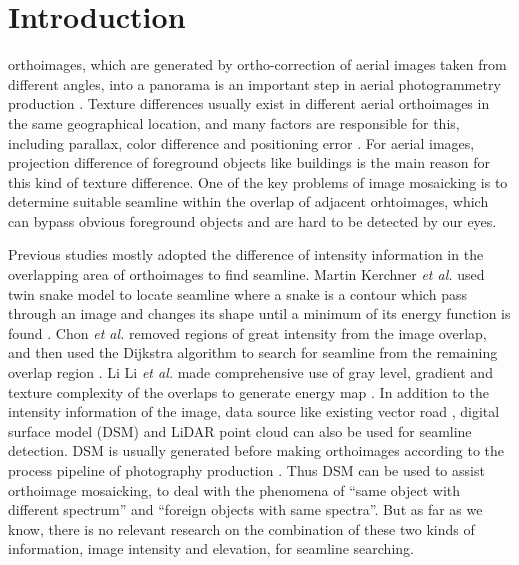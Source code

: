 \documentclass[journal]{IEEEtran}
\begin{document}
\IEEEpeerreviewmaketitle

\section{Introduction}
 orthoimages, which are generated by ortho-correction of aerial images taken from different angles, into a panorama is an important step in aerial photogrammetry production \cite{Chon2010,Pan2014a,Mills2013}. Texture differences usually exist in different aerial orthoimages in the same geographical location, and many factors are responsible for this, including parallax, color difference and positioning error \cite{Li2015,Yu2012,Zhang2014}. For aerial images, projection difference of foreground objects like buildings is the main reason for this kind of texture difference. One of the key problems of image mosaicking is to determine suitable seamline within the overlap of adjacent orhtoimages, which can bypass obvious foreground objects and are hard to be detected by our eyes.

Previous studies mostly adopted the difference of intensity information in the overlapping area of orthoimages to find seamline. Martin Kerchner \textit{et al.} used twin snake model to locate seamline where a snake is a contour which pass through an image and changes its shape until a minimum of its energy function is found \cite{Kerschner2001}. Chon \textit{et al.} removed regions of great intensity from the image overlap, and then used the Dijkstra algorithm to search for seamline from the remaining overlap region \cite{Chon2010}. Li Li \textit{et al.} made comprehensive use of gray level, gradient and texture complexity of the overlaps to generate energy map \cite{Li2016}. In addition to the intensity information of the image, data source like existing vector road \cite{Wan2013}, digital surface model (DSM) \cite{Chen2014} and LiDAR point cloud \cite{Hong2011Intelligent,Pang2016SGM} can also be used for seamline detection. DSM is usually generated before making orthoimages according to the process pipeline of photography production \cite{Mills2013}. Thus DSM can be used to assist orthoimage mosaicking, to deal with the phenomena of ``same object with different spectrum'' and ``foreign objects with same spectra''. But as far as we know, there is no relevant research on the combination of these two kinds of information, image intensity and elevation, for seamline searching. 
\end{document}
